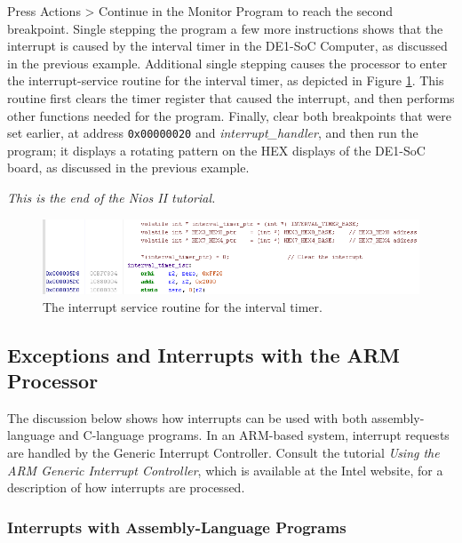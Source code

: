 \documentclass[11pt, twoside, pdftex]{article}
\begin{document}
Press {\sf Actions > Continue} in the Monitor Program to reach
the second breakpoint. Single stepping the program a few more
instructions shows that the interrupt is caused by the interval
timer in the DE1-SoC Computer, as discussed in the previous
example. Additional single stepping causes the processor to enter
the interrupt-service routine for the interval timer,
as depicted in Figure \ref{fig:AMP_interrupts_isr_nios}. This routine first clears the timer
register that caused the interrupt, and then performs other
functions needed for the program.
Finally, clear both breakpoints that were set earlier, at address
\texttt{0x00000020} and {\it interrupt\_handler}, and then run
the program; it displays a rotating pattern on the HEX displays
of the DE1-SoC board, as discussed in the previous example.

{\it This is the end of the Nios II tutorial.}


\begin{figure}[H]
   \begin{center}
      \includegraphics[scale=1]{screenshots/figure55.png}
   \end{center}
   \caption{The interrupt service routine for the interval timer.} 
   \label{fig:AMP_interrupts_isr_nios}
\end{figure}


\subsection{Exceptions and Interrupts with the ARM Processor}
\label{tut:arm_7}

The discussion below shows how interrupts can be used with
both assembly-language and C-language programs. In an 
ARM-based system, interrupt requests are handled by the
Generic Interrupt Controller. Consult the tutorial
{\it Using the ARM Generic Interrupt Controller}, which is
available at the Intel website, for a description of how
interrupts are processed.

\subsubsection{Interrupts with Assembly-Language Programs}
\end{document}
